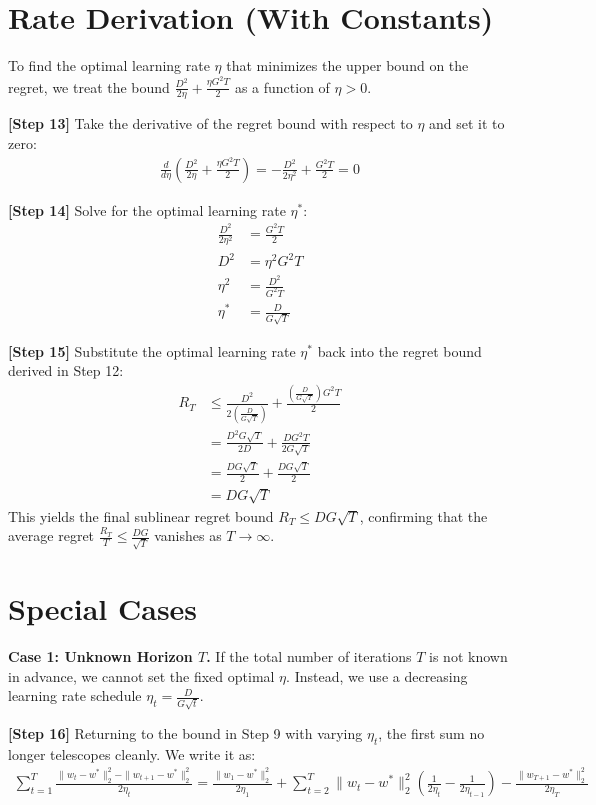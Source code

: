 \documentclass{article}
\begin{document}
\section*{Rate Derivation (With Constants)}
To find the optimal learning rate $\eta$ that minimizes the upper bound on the regret, we treat the bound $\frac{D^2}{2\eta} + \frac{\eta G^2 T}{2}$ as a function of $\eta > 0$.

\textbf{[Step 13]} Take the derivative of the regret bound with respect to $\eta$ and set it to zero:
\begin{align*}
\frac{d}{d\eta} \left( \frac{D^2}{2\eta} + \frac{\eta G^2 T}{2} \right) = -\frac{D^2}{2\eta^2} + \frac{G^2 T}{2} = 0
\end{align*}

\textbf{[Step 14]} Solve for the optimal learning rate $\eta^*$:
\begin{align*}
\frac{D^2}{2\eta^2} &= \frac{G^2 T}{2} \\
D^2 &= \eta^2 G^2 T \\
\eta^2 &= \frac{D^2}{G^2 T} \\
\eta^* &= \frac{D}{G\sqrt{T}}
\end{align*}

\textbf{[Step 15]} Substitute the optimal learning rate $\eta^*$ back into the regret bound derived in Step 12:
\begin{align*}
R_T &\leq \frac{D^2}{2 \left( \frac{D}{G\sqrt{T}} \right)} + \frac{\left( \frac{D}{G\sqrt{T}} \right) G^2 T}{2} \\
&= \frac{D^2 G \sqrt{T}}{2 D} + \frac{D G^2 T}{2 G \sqrt{T}} \\
&= \frac{D G \sqrt{T}}{2} + \frac{D G \sqrt{T}}{2} \\
&= D G \sqrt{T}
\end{align*}
This yields the final sublinear regret bound $R_T \leq D G \sqrt{T}$, confirming that the average regret $\frac{R_T}{T} \leq \frac{DG}{\sqrt{T}}$ vanishes as $T \to \infty$.

\section*{Special Cases}
\textbf{Case 1: Unknown Horizon $T$.} If the total number of iterations $T$ is not known in advance, we cannot set the fixed optimal $\eta$. Instead, we use a decreasing learning rate schedule $\eta_t = \frac{D}{G\sqrt{t}}$. 

\textbf{[Step 16]} Returning to the bound in Step 9 with varying $\eta_t$, the first sum no longer telescopes cleanly. We write it as:
\begin{align*}
\sum_{t=1}^T \frac{\|w_t - w^*\|_2^2 - \|w_{t+1} - w^*\|_2^2}{2\eta_t} = \frac{\|w_1 - w^*\|_2^2}{2\eta_1} + \sum_{t=2}^T \|w_t - w^*\|_2^2 \left( \frac{1}{2\eta_t} - \frac{1}{2\eta_{t-1}} \right) - \frac{\|w_{T+1} - w^*\|_2^2}{2\eta_T}
\end{align*}
\end{document}
